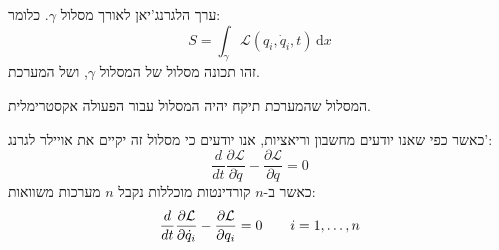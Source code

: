 \documentclass{tstextbook}
\begin{document}
\begin{definition}[פעולה]
ערך הלגרנג'יאן לאורך מסלול \(\gamma\). כלומר:
$$S=\int _{\gamma}\mathcal{L} \left( q_{i},\dot{q}_{i},t \right)  \, \mathrm{d}x $$
זהו תכונה מסלול של המסלול \(\gamma\), ושל המערכת.

\end{definition}
\begin{theorem}
המסלול שהמערכת תיקח יהיה המסלול עבור הפעולה אקסטרימלית. 

\end{theorem}
כאשר כפי שאנו יודעים מחשבון וריאציות, אנו יודעים כי מסלול זה יקיים את אויילר לגרנג':
$$\frac{d}{d t}\frac{\partial \mathcal{\mathcal{\mathcal{L}}}}{\partial\dot{q}}-\frac{\partial \mathcal{L}}{\partial q}=0$$
כאשר ב-\(n\) קורדינטות מוכללות נקבל \(n\) מערכות משוואות:
$$\frac{d}{d t}\frac{\partial{\cal L}}{\partial\dot{q}_{i}}-\frac{\partial{\cal L}}{\partial q_{i}}=0\qquad i=1,\dots,n$$
\end{document}
